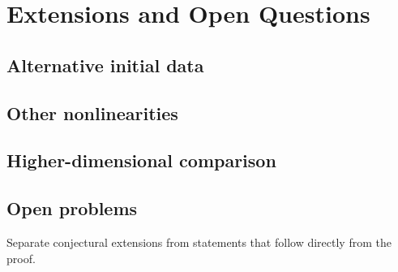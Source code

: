 \section{Extensions and Open Questions}

\subsection{Alternative initial data}

\subsection{Other nonlinearities}

\subsection{Higher-dimensional comparison}

\subsection{Open problems}

\begin{draftnote}
Separate conjectural extensions from statements that follow directly from
the proof.
\end{draftnote}
